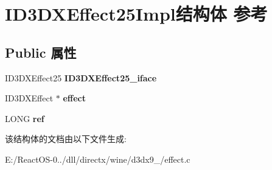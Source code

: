 \hypertarget{struct_i_d3_d_x_effect25_impl}{}\section{I\+D3\+D\+X\+Effect25\+Impl结构体 参考}
\label{struct_i_d3_d_x_effect25_impl}
\subsection*{Public 属性}
\begin{DoxyCompactItemize}
\item 
\mbox{\label{struct_i_d3_d_x_effect25_impl_aa58888e7f94177a778511e9a0392a1ca}} 
I\+D3\+D\+X\+Effect25 {\bfseries I\+D3\+D\+X\+Effect25\+\_\+iface}
\item 
\mbox{\label{struct_i_d3_d_x_effect25_impl_ad5b8c633f7532831c8d7f8f03d381068}} 
I\+D3\+D\+X\+Effect $\ast$ {\bfseries effect}
\item 
\mbox{\label{struct_i_d3_d_x_effect25_impl_ad0011105a32ecd0c895426b382b9f0bc}} 
L\+O\+NG {\bfseries ref}
\end{DoxyCompactItemize}


该结构体的文档由以下文件生成\+:\begin{DoxyCompactItemize}
\item 
E\+:/\+React\+O\+S-\/0../dll/directx/wine/d3dx9\+\_/effect.\+c\end{DoxyCompactItemize}
